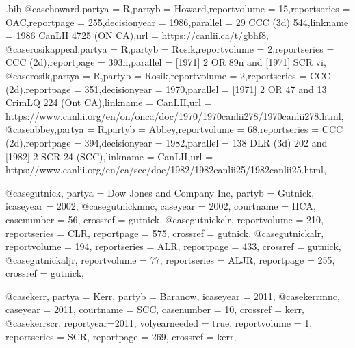 \begin{filecontents*}[overwrite]{\jobname.bib}
@case{howard,partya = {R},partyb = {Howard},reportvolume = {15},reportseries = {OAC},reportpage = {255},decisionyear = {1986},parallel = {29 CCC (3d) 544},linkname = {1986 CanLII 4725 (ON CA)},url = {https://canlii.ca/t/gbhf8},}
@case{rosikappeal,partya = {R},partyb = {Rosik},reportvolume = {2},reportseries = {CCC (2d)},reportpage = {393n},parallel = {[1971] 2 OR 89n and [1971] SCR vi},}
@case{rosik,partya = {R},partyb = {Rosik},reportvolume = {2},reportseries = {CCC (2d)},reportpage = {351},decisionyear = {1970},parallel = {[1971] 2 OR 47 and 13 CrimLQ 224 (Ont CA)},linkname = {CanLII},url = {https://www.canlii.org/en/on/onca/doc/1970/1970canlii278/1970canlii278.html},}
@case{abbey,partya = {R},partyb = {Abbey},reportvolume = {68},reportseries = {CCC (2d)},reportpage = {394},decisionyear = {1982},parallel = {138 DLR (3d) 202 and [1982] 2 SCR 24 (SCC)},linkname = {CanLII},url = {https://www.canlii.org/en/ca/scc/doc/1982/1982canlii25/1982canlii25.html},}










@case{gutnick,
  partya = {Dow Jones and Company Inc}, 
  partyb = {Gutnick},
  icaseyear = {2002},
  }
@case{gutnickmnc,
  caseyear = {2002},
  courtname = {HCA},
  casenumber = {56},
  crossref = {gutnick},
  }
@case{gutnickclr,
  reportvolume = {210},
  reportseries = {CLR},
  reportpage = {575},
  crossref = {gutnick},
  }
@case{gutnickalr,
  reportvolume = {194},
  reportseries = {ALR},
  reportpage = {433},
  crossref = {gutnick},
  }
@case{gutnickaljr,
  reportvolume = {77},
  reportseries = {ALJR},
  reportpage = {255},
  crossref = {gutnick},
  }





@case{kerr,
  partya = {Kerr}, 
  partyb = {Baranow},
  icaseyear = {2011},
  }
@case{kerrmnc,
  caseyear = {2011},
  courtname = {SCC},
  casenumber = {10},
  crossref = {kerr},
  }
@case{kerrscr,
  reportyear={2011},
  volyearneeded = {true},
  reportvolume = {1},
  reportseries = {SCR},
  reportpage = {269},
  crossref = {kerr},
  }




\end{filecontents*}

